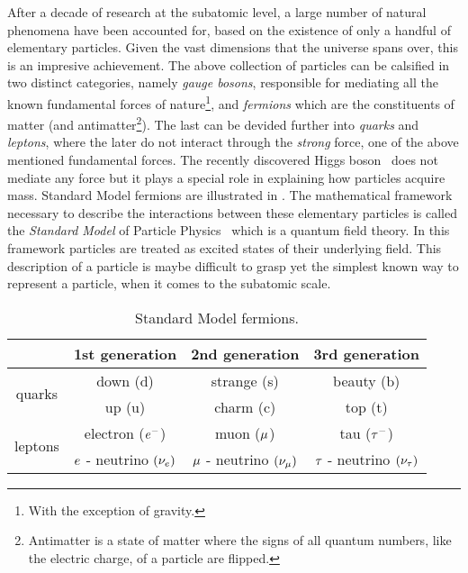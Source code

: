 After a decade of research at the subatomic level, a large number of natural phenomena have been accounted
for, based on the existence of only a handful of elementary particles. Given the vast dimensions that the
universe spans over, this is an impresive achievement. The above collection of particles can be calsified
in two distinct categories, namely {\it gauge bosons}, responsible for mediating all the known fundamental
forces of nature\footnote{With the exception of gravity.}, and {\it fermions} which are the constituents
of matter
(and antimatter\footnote{Antimatter is a state of matter where the signs of all quantum numbers, like the electric charge, of a particle are flipped.}).
The last can be devided further into {\it quarks} and {\it leptons}, where the later do not interact through
the {\it strong} force, one of the above mentioned fundamental forces. The recently discovered Higgs
boson~\cite{higgs-cms,higgs-atlas} does not mediate any force but it plays a special role in explaining how
particles acquire mass. Standard Model fermions are illustrated in .
The mathematical framework necessary to describe the interactions between these elementary particles is called
the \textit{Standard Model} of Particle Physics~\cite{sm-glashow,sm-weinberg,sm-salam} which is a quantum field theory.
In this framework particles are treated as excited states of their underlying field. This description of a
particle is maybe difficult to grasp yet the simplest known way to represent a particle, when it comes to the subatomic scale.


\begin{table}[h!]
  \centering
 \begin{tabular}{cccc}
   \hline
                            &  1st generation                     &   2nd generation              &  3rd generation    \\
   \hline
   \multirow{2}{*}{quarks}  &  down (d)                           &   strange (s)                 &  beauty (b)        \\
                            &  up (u)                             &   charm (c)                   &  top (t)           \\
   \hline
   \multirow{2}{*}{leptons} &   electron ($e^-$)                  &   muon ($\mu$)               &  tau ($\tau^-$)     \\
                            &   $e$ - neutrino $(\nu_e)$  &  $\mu$ - neutrino $(\nu_\mu)$  &  $\tau$ - neutrino $(\nu_\tau)$  \\
   \hline
 \end{tabular}
 \caption{Standard Model fermions.}
 \label{quarksLeptons}
\end{table}

